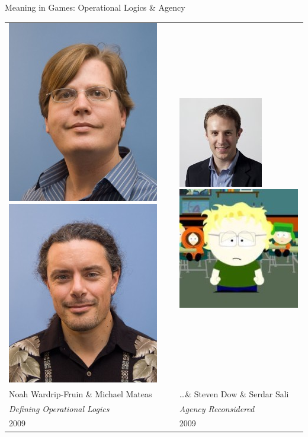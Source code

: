 \documentclass[xcolor=x11names]{beamer}
\newcommand{\work}[1]{\textit{#1}\xspace}
\begin{document}
\begin{frame}{Meaning in Games: Operational Logics \& Agency}
  \begin{table}[h]
  \hspace*{-2em}
  \centering
  \begin{tabular}{C{0.5\textwidth} C{0.5\textwidth}}
    \includegraphics[height=0.3\textwidth]{res/wardrip-fruin.jpg} \hspace*{2pt}
    \includegraphics[height=0.3\textwidth]{res/mateas.jpg} &
    \includegraphics[height=0.28\textwidth]{res/dow.jpg} \hspace*{2pt}
    \includegraphics[height=0.28\textwidth]{res/sali.jpg} \\
    Noah Wardrip-Fruin \& Michael Mateas & \ldots \& Steven Dow \& Serdar Sali \\
    \work{Defining Operational Logics} & \work{Agency Reconsidered} \\
    2009 & 2009
  \end{tabular}
  \end{table}
\end{frame}
\end{document}
